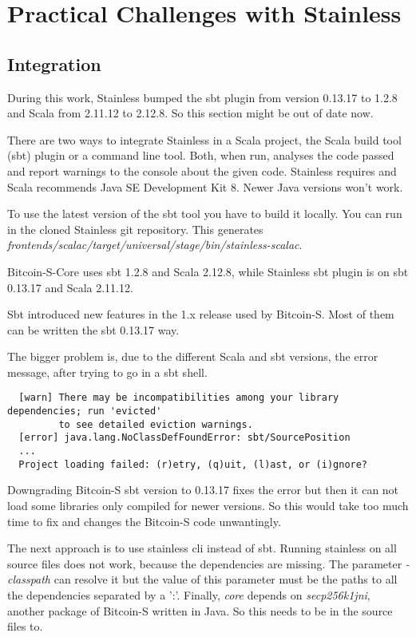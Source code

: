 \chapter{Practical Challenges with Stainless}
\label{chap:appendix_arb}
\endgroup


\section{Integration}

During this work, Stainless bumped the sbt plugin from version 0.13.17 to 1.2.8 and Scala from 2.11.12 to 2.12.8.
So this section might be out of date now.

There are two ways to integrate Stainless in a Scala project, the Scala build tool (sbt) plugin or a command line tool.
Both, when run, analyses the code passed and report warnings to the console about the given code.
Stainless requires and Scala recommends Java SE Development Kit 8.
Newer Java versions won't work.

To use the latest version of the sbt tool you have to build it locally.
You can run  in the cloned Stainless git repository.
This generates \emph{frontends/scalac/target/universal/stage/bin/stainless-scalac}.

Bitcoin-S-Core uses sbt 1.2.8 and Scala 2.12.8, while Stainless sbt plugin is on sbt 0.13.17 and Scala 2.11.12.

Sbt introduced new features in the 1.x release used by Bitcoin-S.
Most of them can be written the sbt 0.13.17 way.

The bigger problem is, due to the different Scala and sbt versions, the error message, after trying to go in a sbt shell.
\begin{verbatim}
  [warn] There may be incompatibilities among your library dependencies; run 'evicted'
         to see detailed eviction warnings.
  [error] java.lang.NoClassDefFoundError: sbt/SourcePosition
  ...
  Project loading failed: (r)etry, (q)uit, (l)ast, or (i)gnore?
\end{verbatim}

Downgrading Bitcoin-S sbt version to 0.13.17 fixes the error but then it can not load some libraries only compiled for newer versions.
So this would take too much time to fix and changes the Bitcoin-S code unwantingly.

The next approach is to use stainless cli instead of sbt.
Running stainless on all source files does not work, because the dependencies are missing.
The parameter \emph{-classpath} can resolve it but the value of this parameter must be the paths to all the dependencies separated by a ':'.
Finally, \emph{core} depends on \emph{secp256k1jni}, another package of Bitcoin-S written in Java.
So this needs to be in the source files to.

